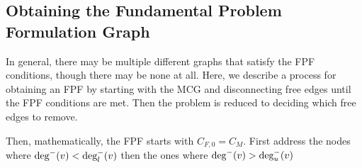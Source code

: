 \subsection{Obtaining the Fundamental Problem Formulation Graph}
In general, there may be multiple different graphs that satisfy the FPF conditions, though there may be none at all. Here, we describe a process for obtaining an FPF by starting with the MCG and disconnecting free edges until the FPF conditions are met. Then the problem is reduced to deciding which free edges to remove.

Then, mathematically, the FPF starts with $C_{F,0} = C_M$.
First address the nodes where $\textrm{deg}^-(v) < \textrm{deg}_l^-(v)$ then the ones where $\textrm{deg}^-(v) > \textrm{deg}_u^-(v)$


